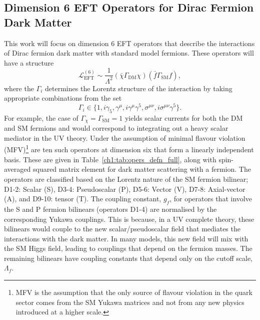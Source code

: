 \subsection{Dimension 6 EFT Operators for Dirac Fermion Dark Matter}
This work will focus on dimension 6 EFT operators that describe the interactions of Dirac fermion dark matter with standard model fermions. These operators will have a structure 
\begin{equation}
    \mathcal{L}_\mathrm{EFT}^{(6)} \sim \frac{1}{\Lambda^2}(\bar{\chi}\Gamma_\mathrm{DM} \chi)(\bar{f}\Gamma_{\mathrm{SM}}f),
\end{equation}
where the $\Gamma_i$ determines the Lorentz structure of the interaction by taking appropriate combinations from the set
\begin{equation}
    \Gamma_i\in \{1, i\gamma_5, \gamma^\mu, i\gamma^\mu \gamma^5, \sigma^{\mu\nu}, i \sigma^{\mu\nu}\gamma^5\}.
\end{equation}
For example, the case of $\Gamma_\chi = \Gamma_\mathrm{SM} = 1$ yields scalar currents for both the DM and SM fermions and would correspond to integrating out a heavy scalar mediator in the UV theory. Under the assumption of minimal flavour violation (MFV)\footnote{MFV is the assumption that the only source of flavour violation in the quark sector comes from the SM Yukawa matrices and not from any new physics introduced at a higher scale.} are ten such operators at dimension six that form a linearly independent basis. These are given in Table~\ref{ch1:tab:opers_defn_full}, along with spin-averaged squared matrix element for dark matter scattering with a fermion. 
The operators are classified based on the Lorentz nature of the SM fermion bilinear; D1-2: Scalar (S), D3-4: Pseudoscalar (P), D5-6: Vector (V), D7-8: Axial-vector (A), and D9-10: tensor (T).
The coupling constant, $g_f$, for operators that involve the S and P fermion bilinears (operators D1-4) are normalised by the corresponding Yukawa couplings. This is because, in a UV complete theory, these bilinears would couple to the new scalar/pseudoscalar field that mediates the interactions with the dark matter. In many models, this new field will mix with the SM Higgs field, leading to couplings that depend on the fermion masses. The remaining bilinears have coupling constants that depend only on the cutoff scale, $\Lambda_f$.


